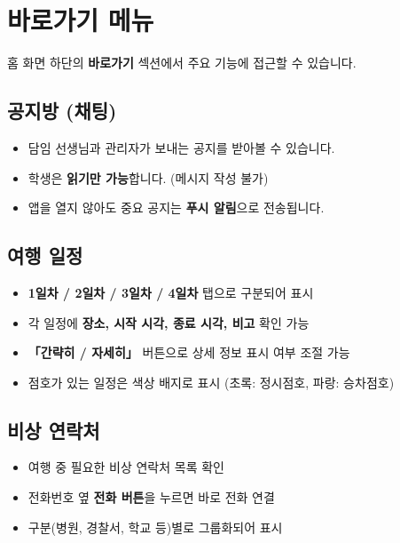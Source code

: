 \documentclass[a4paper,11pt]{article}
\begin{document}
\section{바로가기 메뉴}

홈 화면 하단의 \textbf{바로가기} 섹션에서 주요 기능에 접근할 수 있습니다.

\subsection{공지방 (채팅)}

\begin{itemize}
  \item 담임 선생님과 관리자가 보내는 공지를 받아볼 수 있습니다.
  \item 학생은 \textbf{읽기만 가능}합니다. (메시지 작성 불가)
  \item 앱을 열지 않아도 중요 공지는 \textbf{푸시 알림}으로 전송됩니다.
\end{itemize}

\subsection{여행 일정}

\begin{itemize}
  \item \textbf{1일차 / 2일차 / 3일차 / 4일차} 탭으로 구분되어 표시
  \item 각 일정에 \textbf{장소, 시작 시각, 종료 시각, 비고} 확인 가능
  \item \textbf{「간략히 / 자세히」} 버튼으로 상세 정보 표시 여부 조절 가능
  \item 점호가 있는 일정은 색상 배지로 표시 (초록: 정시점호, 파랑: 승차점호)
\end{itemize}

\subsection{비상 연락처}

\begin{itemize}
  \item 여행 중 필요한 비상 연락처 목록 확인
  \item 전화번호 옆 \textbf{전화 버튼}을 누르면 바로 전화 연결
  \item 구분(병원, 경찰서, 학교 등)별로 그룹화되어 표시
\end{itemize}

\end{document}
